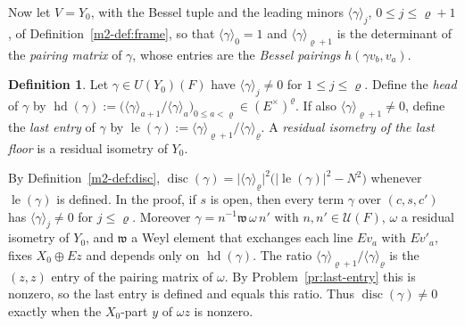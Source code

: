 \documentclass[reqno]{amsart}
\theoremstyle{definition}
\newtheorem{definition}{Definition}[section]
\theoremstyle{plain}
\theoremstyle{remark}
\newcommand{\Uc}{\mathcal{U}}
\newcommand{\hd}{\operatorname{hd}}
\newcommand{\lE}{\operatorname{le}}
\newcommand{\disc}{\operatorname{disc}}
\begin{document}
Now let \(V=Y_0\), with the Bessel tuple and the leading minors \(\langle\gamma\rangle_j\), \(0\le j\le\varrho+1\), of Definition~\ref{m2-def:frame}, so that \(\langle\gamma\rangle_0=1\) and \(\langle\gamma\rangle_{\varrho+1}\) is the determinant of the \emph{pairing matrix} of \(\gamma\), whose entries are the \emph{Bessel pairings} \(h(\gamma v_b,v_a)\).

\begin{definition}\label{def:head}
Let \(\gamma\in U(Y_0)(F)\) have \(\langle\gamma\rangle_j\ne0\) for \(1\le j\le\varrho\).  Define the \emph{head} of \(\gamma\) by \(\hd(\gamma):=\bigl(\langle\gamma\rangle_{a+1}/\langle\gamma\rangle_a\bigr)_{0\le a<\varrho}\in(E^\times)^\varrho\).  If also \(\langle\gamma\rangle_{\varrho+1}\ne0\), define the \emph{last entry} of \(\gamma\) by \(\lE(\gamma):=\langle\gamma\rangle_{\varrho+1}/\langle\gamma\rangle_\varrho\).  A \emph{residual isometry of the last floor} is a residual isometry of \(Y_0\).
\end{definition}

By Definition~\ref{m2-def:disc}, \(\disc(\gamma)=\lvert\langle\gamma\rangle_\varrho\rvert^2\bigl(\lvert\lE(\gamma)\rvert^2-N^2\bigr)\) whenever \(\lE(\gamma)\) is defined.  In the proof, if \(s\) is open, then every term \(\gamma\) over \((c,s,c')\) has \(\langle\gamma\rangle_j\ne0\) for \(j\le\varrho\).  Moreover \(\gamma=n^{-1}\mathfrak w\,\omega\,n'\) with \(n,n'\in\Uc(F)\), \(\omega\) a residual isometry of \(Y_0\), and \(\mathfrak w\) a Weyl element that exchanges each line \(Ev_a\) with \(Ev'_a\), fixes \(X_0\oplus Ez\) and depends only on \(\hd(\gamma)\).  The ratio \(\langle\gamma\rangle_{\varrho+1}/\langle\gamma\rangle_\varrho\) is the \((z,z)\) entry of the pairing matrix of \(\omega\).  By Problem~\ref{pr:last-entry} this is nonzero, so the last entry is defined and equals this ratio.  Thus \(\disc(\gamma)\ne0\) exactly when the \(X_0\)-part \(y\) of \(\omega z\) is nonzero.
\end{document}
